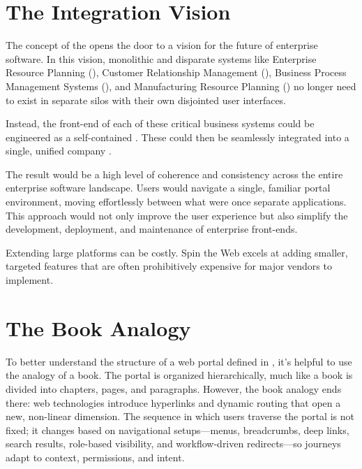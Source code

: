 \section{The Integration Vision}
\label{sec:integration-vision}

The concept of the \textbf{\webbaselet{}} opens the door to a vision for the future of enterprise software. In this vision, monolithic and disparate systems like Enterprise Resource Planning (\erp{}), Customer Relationship Management (\crm{}), Business Process Management Systems (\bpms{}), and Manufacturing Resource Planning (\mrp{}) no longer need to exist in separate silos with their own disjointed user interfaces.

Instead, the front-end of each of these critical business systems could be engineered as a self-contained \textbf{\webbaselet{}}. These  could then be seamlessly integrated into a single, unified company \textbf{\webbase{}}.

The result would be a high level of coherence and consistency across the entire enterprise software landscape. Users would navigate a single, familiar portal environment, moving effortlessly between what were once separate applications. This approach would not only improve the user experience but also simplify the development, deployment, and maintenance of enterprise front-ends.

Extending large platforms can be costly. Spin the Web excels at adding smaller, targeted features that are often prohibitively expensive for major vendors to implement.

\section{The Book Analogy}
\label{sec:book-analogy}

To better understand the structure of a web portal defined in \wbdl{}, it's helpful to use the analogy of a book. The portal is organized hierarchically, much like a book is divided into chapters, pages, and paragraphs. However, the book analogy ends there: web technologies introduce hyperlinks and dynamic routing that open a new, non-linear dimension. The sequence in which users traverse the portal is not fixed; it changes based on navigational setups---menus, breadcrumbs, deep links, search results, role-based visibility, and workflow-driven redirects---so journeys adapt to context, permissions, and intent.


